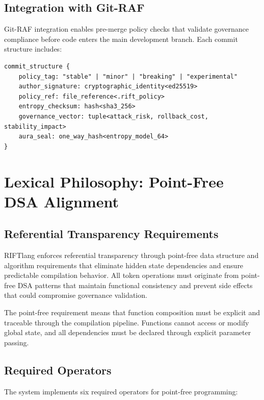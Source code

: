 \subsection{Integration with Git-RAF}

Git-RAF integration enables pre-merge policy checks that validate governance compliance before code enters the main development branch. Each commit structure includes:

\begin{lstlisting}[style=riftlang]
commit_structure {
    policy_tag: "stable" | "minor" | "breaking" | "experimental"
    author_signature: cryptographic_identity<ed25519>
    policy_ref: file_reference<.rift_policy>
    entropy_checksum: hash<sha3_256>
    governance_vector: tuple<attack_risk, rollback_cost, stability_impact>
    aura_seal: one_way_hash<entropy_model_64>
}
\end{lstlisting}

\section{Lexical Philosophy: Point-Free DSA Alignment}

\subsection{Referential Transparency Requirements}

RIFTlang enforces referential transparency through point-free data structure and algorithm requirements that eliminate hidden state dependencies and ensure predictable compilation behavior. All token operations must originate from point-free DSA patterns that maintain functional consistency and prevent side effects that could compromise governance validation.

The point-free requirement means that function composition must be explicit and traceable through the compilation pipeline. Functions cannot access or modify global state, and all dependencies must be declared through explicit parameter passing.

\subsection{Required Operators}

The system implements six required operators for point-free programming:

